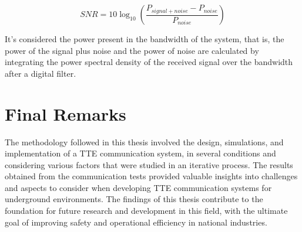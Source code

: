 \begin{equation}
    \label{eq:snr}
    SNR = 10 \log_{10} \left( \frac{P_{signal+noise} - P_{noise}}{P_{noise}} \right)
\end{equation}

It's considered the power present in the bandwidth of the system, that is, the power of the signal plus noise and the power of noise are calculated by integrating the power spectral density of the received signal over the bandwidth after a digital filter.

\section{Final Remarks}

The methodology followed in this thesis involved the design, simulations, and implementation of a TTE communication system, in several conditions and considering various factors that were studied in an iterative process. The results obtained from the communication tests provided valuable insights into challenges and aspects to consider when developing TTE communication systems for underground environments. The findings of this thesis contribute to the foundation for future research and development in this field, with the ultimate goal of improving safety and operational efficiency in national industries.